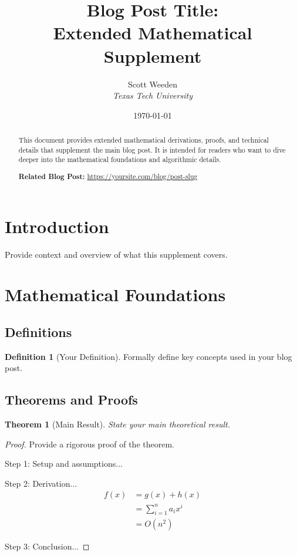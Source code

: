 \documentclass[12pt]{article}
\title{Blog Post Title: \\
Extended Mathematical Supplement}
\author{Scott Weeden \\
\textit{Texas Tech University}}
\date{\today}
\newtheorem{theorem}{Theorem}
\theoremstyle{definition}
\newtheorem{definition}{Definition}
\begin{document}
\maketitle

\begin{abstract}
This document provides extended mathematical derivations, proofs, and technical details that supplement the main blog post. It is intended for readers who want to dive deeper into the mathematical foundations and algorithmic details.

\textbf{Related Blog Post:} \url{https://yoursite.com/blog/post-slug}
\end{abstract}

\tableofcontents

\section{Introduction}
Provide context and overview of what this supplement covers.

\section{Mathematical Foundations}

\subsection{Definitions}
\begin{definition}[Your Definition]
Formally define key concepts used in your blog post.
\end{definition}

\subsection{Theorems and Proofs}
\begin{theorem}[Main Result]
State your main theoretical result.
\end{theorem}

\begin{proof}
Provide a rigorous proof of the theorem.

Step 1: Setup and assumptions...

Step 2: Derivation...
\begin{align}
f(x) &= g(x) + h(x) \\
     &= \sum_{i=1}^{n} a_i x^i \\
     &= O(n^2)
\end{align}

Step 3: Conclusion...
\end{proof}
\end{document}
